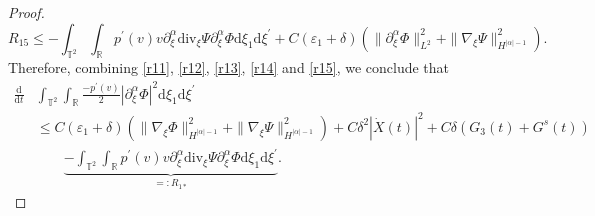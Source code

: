 \documentclass[10pt,reqno]{amsart}
\numberwithin{equation}{section}
\newcommand{\dif}{\mathrm{d}}
\newcommand{\ddiv}{\mathrm{div}}
\begin{document}
\begin{proof}
\begin{equation}\label{r15}
R_{15}\le -\int_{\mathbb{T}^2}\int_{\mathbb{R}}p^\prime(v)
v\partial_\xi^\alpha\ddiv_\xi\Psi\partial_\xi^\alpha\Phi\dif \xi_1\dif \xi^{\prime}
+C(\varepsilon_1+\delta)\left(
\|\partial_\xi^\alpha\Phi\|^2_{L^2}
+
\|\nabla_\xi\Psi\|_{H^{|\alpha|-1}}^2\right).
\end{equation}
Therefore, combining \eqref{r11}, \eqref{r12}, \eqref{r13}, \eqref{r14} and \eqref{r15}, we conclude that
\begin{equation}\label{hg1.1}
\begin{aligned}
\frac{\dif}{\dif t}&\int_{\mathbb{T}^2}\int_{\mathbb{R}}
\frac{-p^\prime(v)}{2}|\partial_\xi^\alpha\Phi|^2\dif \xi_1\dif \xi^{\prime}\\
&\le C(\varepsilon_1+\delta)\left(
\|\nabla_\xi\Phi\|_{H^{|\alpha|-1}}^2
+
\|\nabla_\xi\Psi\|_{H^{|\alpha|-1}}^2\right)+C\delta^2|\dot{X}(t)|^2
+C\delta(G_3(t)+G^s(t))\\
&\qquad\underbrace{-\int_{\mathbb{T}^2}\int_{\mathbb{R}}p^\prime(v)
v\partial_\xi^\alpha\ddiv_\xi\Psi\partial_\xi^\alpha\Phi\dif \xi_1\dif \xi^{\prime}}\limits_{=:R_{1\ast}}.
\end{aligned}
\end{equation}



\end{proof}
\end{document}
